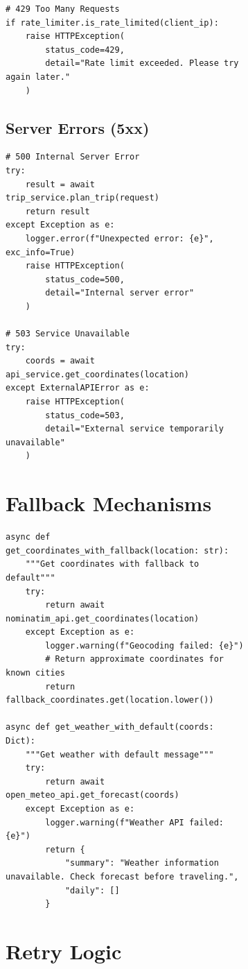 \documentclass[12pt,a4paper]{report}
\begin{document}
\begin{figure}[H]
\begin{plantuml}
\begin{figure}[H]
\begin{plantuml}
\begin{lstlisting}[style=pythonstyle, caption={Client Error Handling}]
# 429 Too Many Requests
if rate_limiter.is_rate_limited(client_ip):
    raise HTTPException(
        status_code=429,
        detail="Rate limit exceeded. Please try again later."
    )
\end{lstlisting}

\subsection{Server Errors (5xx)}

\begin{lstlisting}[style=pythonstyle, caption={Server Error Handling}]
# 500 Internal Server Error
try:
    result = await trip_service.plan_trip(request)
    return result
except Exception as e:
    logger.error(f"Unexpected error: {e}", exc_info=True)
    raise HTTPException(
        status_code=500,
        detail="Internal server error"
    )

# 503 Service Unavailable
try:
    coords = await api_service.get_coordinates(location)
except ExternalAPIError as e:
    raise HTTPException(
        status_code=503,
        detail="External service temporarily unavailable"
    )
\end{lstlisting}

\section{Fallback Mechanisms}

\begin{lstlisting}[style=pythonstyle, caption={Fallback Strategy}]
async def get_coordinates_with_fallback(location: str):
    """Get coordinates with fallback to default"""
    try:
        return await nominatim_api.get_coordinates(location)
    except Exception as e:
        logger.warning(f"Geocoding failed: {e}")
        # Return approximate coordinates for known cities
        return fallback_coordinates.get(location.lower())

async def get_weather_with_default(coords: Dict):
    """Get weather with default message"""
    try:
        return await open_meteo_api.get_forecast(coords)
    except Exception as e:
        logger.warning(f"Weather API failed: {e}")
        return {
            "summary": "Weather information unavailable. Check forecast before traveling.",
            "daily": []
        }
\end{lstlisting}

\section{Retry Logic}


\end{plantuml}
\end{figure}
\end{plantuml}
\end{figure}
\end{document}
